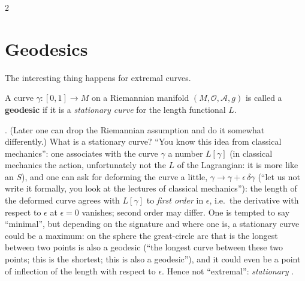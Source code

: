 \begin{paracol}{2}
\section{Geodesics}\label{sec:c10-geodesics}

The interesting thing happens for extremal curves.

\begin{definition}\label{def:c10-geodesic}
A curve $\gamma\colon[0,1]\to M$ on a Riemannian manifold $(M,\mathcal O,\mathcal A,g)$ is called a \textbf{geodesic} if it is a \emph{stationary curve} for the length functional $L$.
\end{definition}
.
(Later one can drop the Riemannian assumption and do it somewhat differently.) What is a stationary curve? ``You know this idea from classical mechanics'': one associates with the curve $\gamma$ a number $L[\gamma]$ (in classical mechanics the action, unfortunately not the $L$ of the Lagrangian: it is more like an $S$), and one can ask for deforming the curve a little, $\gamma\to\gamma+\epsilon\,\delta\gamma$ (``let us not write it formally, you look at the lectures of classical mechanics''): the length of the deformed curve agrees with $L[\gamma]$ to \emph{first order} in $\epsilon$, i.e.\ the derivative with respect to $\epsilon$ at $\epsilon=0$ vanishes; second order may differ.
One is tempted to say ``minimal'', but depending on the signature and where one is, a stationary curve could be a maximum: on the sphere the great-circle arc that is the longest between two points is also a geodesic (``the longest curve between these two points; this is the shortest; this is also a geodesic''), and it could even be a point of inflection of the length with respect to $\epsilon$. Hence not ``extremal'': \emph{stationary}
.


\end{paracol}

